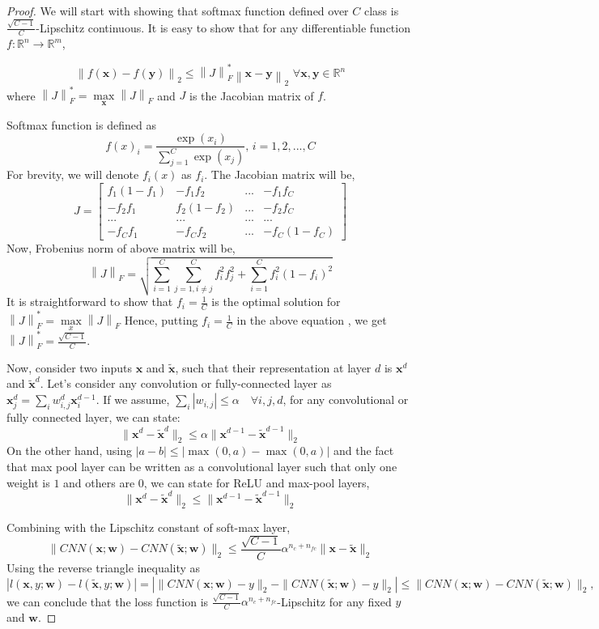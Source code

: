 \documentclass{article} %
\begin{document}
\begin{proof}
We will start with showing that softmax function defined over $C$ class is $\frac{\sqrt{C-1}}{C}$-Lipschitz continuous. It is easy to show that for any differentiable function \mbox{$f:\mathbb{R}^n\rightarrow\mathbb{R}^m$},

\[
\left \| f(\mathbf{x})-f(\mathbf{y})\right \|_2 \leq \left \|J\right \|^*_F  \left\| \mathbf{x}-\mathbf{y}\right\|_2  \, \, \forall \mathbf{x},\mathbf{y}\in\mathbb{R}^n
\]
where $\left \|J\right \|^*_F = \max\limits_{\mathbf{x}} \left \|J\right \|_F$ and $J$ is the Jacobian matrix of $f$.

Softmax function is defined as
\[
f(x)_i = \frac{\exp(x_i)}{\sum\limits_{j=1}^{C}\exp(x_j)}, \, i={1,2,...,C}
\]
For brevity, we will denote $f_i(x)$ as $f_i$. The Jacobian matrix will be,
\[
J = \begin{bmatrix} f_1(1-f_1) & -f_1f_2  & ... & -f_1f_C \\
-f_2f_1 & f_2(1-f_2)  & ...  & -f_2f_C \\
... & ... & ... & ...  \\
-f_{C}f_{1} & -f_{C}f_{2}  & ...  & -f_{C}(1-f_{C})
\end{bmatrix}
\]
Now, Frobenius norm of above matrix will be,
\[
\left \| J \right \|_F = \sqrt{\sum\limits_{i=1}^{C}\sum\limits_{j=1, i\neq j}^{C}f_{i}^{2}f_{j}^{2} + \sum\limits_{i=1}^{C} f_i^2(1-f_i)^2}
\]
It is straightforward to show that $f_i = \frac{1}{C}$ is the optimal solution for $\left \| J \right \|^{*}_F = \max\limits_{x}\left \| J \right \|_F $ Hence, putting $f_i = \frac{1}{C}$ in the above equation , we get \mbox{$\left \| J \right \|^{*}_F = \frac{\sqrt{C-1}}{C}$}.

Now, consider two inputs $\mathbf{x}$ and $\mathbf{\tilde{x}}$, such that their representation at layer $d$ is $\mathbf{x}^d$ and $\mathbf{\tilde{x}}^d$. Let's consider any convolution or fully-connected layer as $\mathbf{x}^d_j = \sum_i w_{i,j}^d \mathbf{x}^{d-1}_i$. If we assume, \mbox{$\sum_i |w_{i,j}| \leq \alpha \quad \forall i,j,d$}, for any convolutional or fully connected layer, we can state:
\[
\|\mathbf{x}^d - \mathbf{\tilde{x}}^d\|_2 \leq  \alpha \|\mathbf{x}^{d-1} - \mathbf{\tilde{x}}^{d-1}\|_2
\] 
On the other hand, using $|a-b| \leq |\max(0, a) - \max(0,a)|$ and the fact that max pool layer can be written as a convolutional layer such that only one weight is $1$ and others are $0$, we can state for ReLU and max-pool layers,
\[
\|\mathbf{x}^d - \mathbf{\tilde{x}}^d\|_2 \leq  \|\mathbf{x}^{d-1} - \mathbf{\tilde{x}}^{d-1}\|_2
\] 

Combining with the Lipschitz constant of soft-max layer,
\[
\|CNN(\mathbf{x};\mathbf{w}) - CNN(\mathbf{\tilde{x}};\mathbf{w})\|_2 \leq   \frac{\sqrt{C-1}}{C} \alpha^{n_c+n_{fc}}  \|\mathbf{x}-\mathbf{\tilde{x}}\|_2
\]
Using the reverse triangle inequality as
\[
|l(\mathbf{x},y;\mathbf{w})-l(\mathbf{\tilde{x}},y;\mathbf{w})| = |\| CNN(\mathbf{x};\mathbf{w}) -y\|_2 -\|CNN(\mathbf{\tilde{x}};\mathbf{w})-y\|_2 | \leq \|CNN(\mathbf{x};\mathbf{w}) - CNN(\mathbf{\tilde{x}};\mathbf{w})\|_2,
\]
we can conclude that the loss function is $\frac{\sqrt{C-1}}{C} \alpha^{n_c+n_{fc}}$-Lipschitz for any fixed $y$ and $\mathbf{w}$.
\end{proof}
\end{document}
